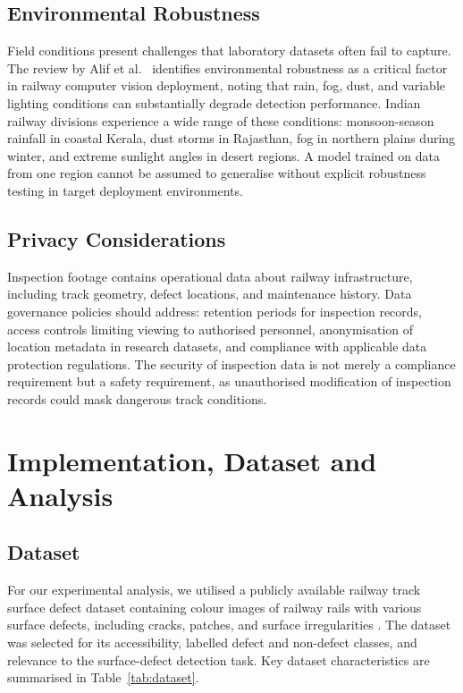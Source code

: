 \documentclass[conference]{IEEE}
\begin{document}
\subsection{Environmental Robustness}

Field conditions present challenges that laboratory datasets often fail to capture. The review by Alif et al.\ \cite{alif2026} identifies environmental robustness as a critical factor in railway computer vision deployment, noting that rain, fog, dust, and variable lighting conditions can substantially degrade detection performance. Indian railway divisions experience a wide range of these conditions: monsoon-season rainfall in coastal Kerala, dust storms in Rajasthan, fog in northern plains during winter, and extreme sunlight angles in desert regions. A model trained on data from one region cannot be assumed to generalise without explicit robustness testing in target deployment environments.

\subsection{Privacy Considerations}

Inspection footage contains operational data about railway infrastructure, including track geometry, defect locations, and maintenance history. Data governance policies should address: retention periods for inspection records, access controls limiting viewing to authorised personnel, anonymisation of location metadata in research datasets, and compliance with applicable data protection regulations. The security of inspection data is not merely a compliance requirement but a safety requirement, as unauthorised modification of inspection records could mask dangerous track conditions.

\section{Implementation, Dataset and Analysis}
\label{sec:implementation}

\subsection{Dataset}

For our experimental analysis, we utilised a publicly available railway track surface defect dataset containing colour images of railway rails with various surface defects, including cracks, patches, and surface irregularities \cite{zenodo2023}. The dataset was selected for its accessibility, labelled defect and non-defect classes, and relevance to the surface-defect detection task. Key dataset characteristics are summarised in Table~\ref{tab:dataset}.
\end{document}
